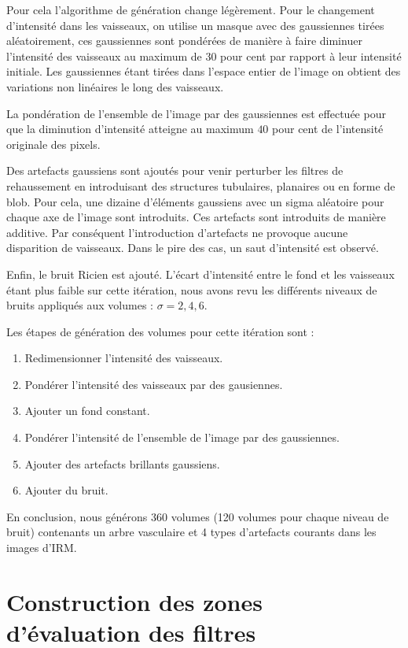 Pour cela l'algorithme de génération change légèrement. Pour le changement d'intensité dans les vaisseaux, on utilise un masque avec des gaussiennes tirées aléatoirement, ces gaussiennes sont pondérées de manière à faire diminuer l'intensité des vaisseaux au maximum de $30$ pour cent par rapport à leur intensité initiale. Les gaussiennes étant tirées dans l'espace entier de l'image on obtient des variations non linéaires le long des vaisseaux.

La pondération de l'ensemble de l'image par des gaussiennes est effectuée pour que la diminution d'intensité atteigne au maximum $40$ pour cent de l'intensité originale des pixels.

Des artefacts gaussiens sont ajoutés pour venir perturber les filtres de rehaussement en introduisant des structures tubulaires, planaires ou en forme de blob. Pour cela, une dizaine d'éléments gaussiens avec un sigma aléatoire pour chaque axe de l'image sont introduits. Ces artefacts sont introduits de manière additive. Par conséquent l'introduction d'artefacts ne provoque aucune disparition de vaisseaux. Dans le pire des cas, un saut d'intensité est observé.

Enfin, le bruit Ricien est ajouté. L'écart d'intensité entre le fond et les vaisseaux étant plus faible sur cette itération, nous avons revu les différents niveaux de bruits appliqués aux volumes : $\sigma={2,4,6}$.

Les étapes de génération des volumes pour cette itération sont :

\begin{enumerate}
  \item Redimensionner l'intensité des vaisseaux.
  \item Pondérer l'intensité des vaisseaux par des gausiennes.
  \item Ajouter un fond constant. 
  \item Pondérer l'intensité de l'ensemble de l'image par des gaussiennes.
  \item Ajouter des artefacts brillants gaussiens.
  \item Ajouter du bruit.
  \end{enumerate}

En conclusion, nous générons 360 volumes (120 volumes pour chaque niveau de bruit) contenants un arbre vasculaire et 4 types d'artefacts courants dans les images d'IRM.
 
\section{Construction des zones d'évaluation des filtres}

